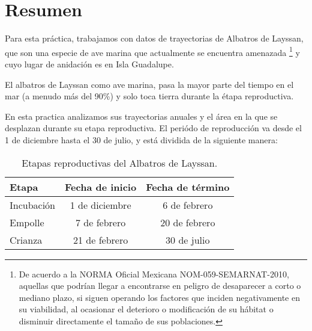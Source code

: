 
\section{Resumen}

Para esta práctica, trabajamos con datos de trayectorias de Albatros de Layssan,
que son una especie de ave marina que actualmente se encuentra amenazada
\footnote{De acuerdo a la NORMA Oficial Mexicana NOM-059-SEMARNAT-2010, aquellas
que podrían llegar a encontrarse en peligro de desaparecer a corto o mediano
plazo, si siguen operando los factores que inciden negativamente en su
viabilidad, al ocasionar el deterioro o modificación de su hábitat o disminuir
directamente el tamaño de sus poblaciones.} y cuyo lugar de anidación es en Isla
Guadalupe.

El albatros de Layssan como ave marina, pasa la mayor parte del tiempo en el mar
(a menudo más del 90\%) y solo toca tierra durante la étapa reproductiva.

En esta practica analizamos sus trayectorias anuales y el área en la que se
desplazan durante su etapa reproductiva. El periódo de reproducción va desde el
1 de diciembre hasta el 30 de julio, y está dividida de la siguiente manera:

\begin{table}[h!]
\caption{Etapas reproductivas del Albatros de Layssan.}
\begin{center}
\begin{tabular}{lcc}
    Etapa & Fecha de inicio & Fecha de término \\
    \hline
    Incubación & 1 de diciembre & 6 de febrero \\
    Empolle & 7 de febrero & 20 de febrero \\
    Crianza & 21 de febrero & 30 de julio
\end{tabular}
\end{center}
\end{table}
